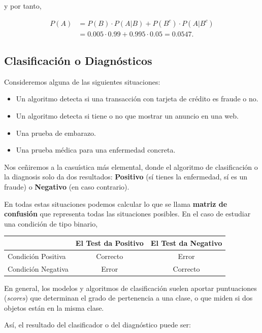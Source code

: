 \documentclass[
  letterpaper,
  DIV=11,
  numbers=noendperiod]{scrreprt}
\providecommand{\tightlist}{%
  \setlength{\itemsep}{0pt}\setlength{\parskip}{0pt}}\usepackage{longtable,booktabs,array}
\begin{document}
y por tanto,

\[
\begin{array}{rl}
P(A) & =P(B)\cdot P(A|B)+P(B^c)\cdot P(A|B^c)\\ &
=0.005\cdot 0.99+0.995\cdot 0.05=0.0547.\end{array}
\]

\hypertarget{clasificaciuxf3n-o-diagnuxf3sticos}{%
\subsection{Clasificación o
Diagnósticos}\label{clasificaciuxf3n-o-diagnuxf3sticos}}

Consideremos alguna de las siguientes situaciones:

\begin{itemize}
\tightlist
\item
  Un algoritmo detecta si una transacción con tarjeta de crédito es
  fraude o no.
\item
  Un algoritmo detecta si tiene o no que mostrar un anuncio en una web.
\item
  Una prueba de embarazo.
\item
  Una prueba médica para una enfermedad concreta.
\end{itemize}

Nos ceñiremos a la casuística más elemental, donde el algoritmo de
clasificación o la diagnosis solo da dos resultados: \textbf{Positivo}
(sí tienes la enfermedad, sí es un fraude) o \textbf{Negativo} (en caso
contrario).

En todas estas situaciones podemos calcular lo que se llama
\textbf{matriz de confusión} que representa todas las situaciones
posibles. En el caso de estudiar una condición de tipo binario,

\begin{longtable}[]{@{}lcc@{}}
\toprule\noalign{}
& El Test da Positivo & El Test da Negativo \\
\midrule\noalign{}
\endhead
\bottomrule\noalign{}
\endlastfoot
Condición Positiva & Correcto & Error \\
Condición Negativa & Error & Correcto \\
\end{longtable}

En general, los modelos y algoritmos de clasificación suelen aportar
puntuaciones (\emph{scores}) que determinan el grado de pertenencia a
una clase, o que miden si dos objetos están en la misma clase.

Así, el resultado del clasificador o del diagnóstico puede ser:
\end{document}
